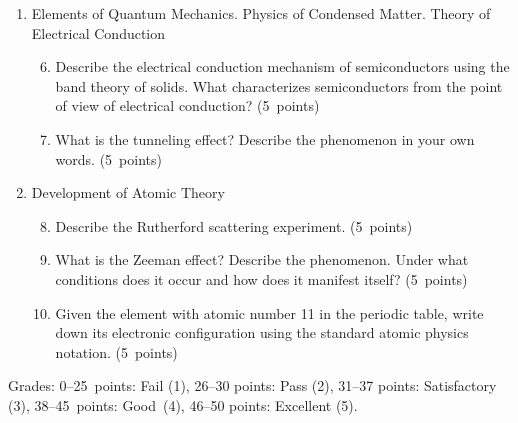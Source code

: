 \documentclass[a4paper,12pt]{letter}
\begin{document}
\begin{enumerate}[label=\Roman*.]

\item Elements of Quantum Mechanics. Physics of Condensed Matter. Theory of Electrical Conduction

\begin{enumerate}[label=\arabic*.]
\setcounter{enumii}{5} %
  
\item Describe the electrical conduction mechanism of semiconductors using the band theory of solids. What characterizes semiconductors from the point of view of electrical conduction? \hfill (5~points)

\item What is the tunneling effect? Describe the phenomenon in your own words. \hfill (5~points)

\end{enumerate}

  
\item Development of Atomic Theory

\begin{enumerate}[label=\arabic*.]
\setcounter{enumii}{7} %

\item Describe the Rutherford scattering experiment. \hfill (5~points)

\item What is the Zeeman effect? Describe the phenomenon. Under what conditions does it occur and how does it manifest itself? \hfill (5~points)

\item Given the element with atomic number 11 in the periodic table, write down its electronic configuration using the standard atomic physics notation. \hfill (5~points)
  
\end{enumerate}

\end{enumerate}


Grades: 0–25~points: Fail (1), 26–30 points: Pass (2), 31–37 points: Satisfactory (3), 38–45~points: Good~(4), 46–50 points: Excellent (5).


\vfill
\end{document}
